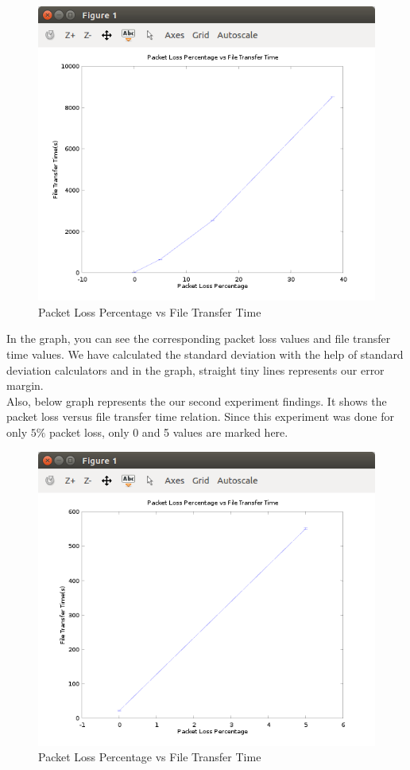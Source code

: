\documentclass[conference]{IEEEtran}
\begin{document}
\begin{figure}[H]
    \centering
    \includegraphics[scale=0.45]{figure.png}
    \caption{Packet Loss Percentage vs File Transfer Time}
\end{figure}

In the graph, you can see the corresponding packet loss values and file transfer time values. We have calculated the standard deviation with the help of standard deviation calculators and in the graph, straight tiny lines represents our error margin.\\

Also, below graph represents the our second experiment findings. It shows the packet loss versus file transfer time relation. Since this experiment was done for only $5\%$ packet loss, only 0 and 5 values are marked here.\\

\begin{figure}[H]
    \centering
    \includegraphics[scale=0.45]{figure2.png}
    \caption{Packet Loss Percentage vs File Transfer Time}
\end{figure}
\end{document}
